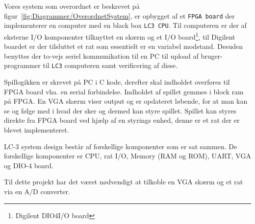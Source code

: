 Vores system som overordnet er beskrevet på figur~\vref{fig:Diagrammer/OverordnetSystem}, er opbygget af et \texttt{FPGA board} der implementerer en computer med en black box \texttt{LC3 CPU}. Til computeren er der af eksterne I/O komponenter tilknyttet en skærm og et I/O board\footnote{Digilent DIO4\texttrademark I/O board}, til Digilent boardet er der tilsluttet et rat som essentielt er en variabel modstand. Desuden benyttes der to-vejs seriel kommunikation til en PC til upload af bruger-programmer til \texttt{LC3} computeren samt verificering af disse.


Spillogikken er skrevet på PC i C kode, derefter skal indholdet overføres til FPGA board vha. en serial forbindelse. Indholdet af spillet gemmes i block ram på FPGA. En VGA skærm viser output og er opdateret løbende, for at man kan se og følge med i hvad der sker og dermed kan styre spillet. Spillet kan styres direkte fra FPGA board ved hjælp af en styrings enhed, denne er et rat der er blevet implementeret.

LC-3 system design består af forskellige komponenter som er sat sammen. De forskellige komponenter er CPU, rat I/O, Memory (RAM og ROM), UART, VGA og DIO-4 board.

Til dette projekt har det været nødvendigt at tilkoble en VGA skærm og et rat via en A/D converter.